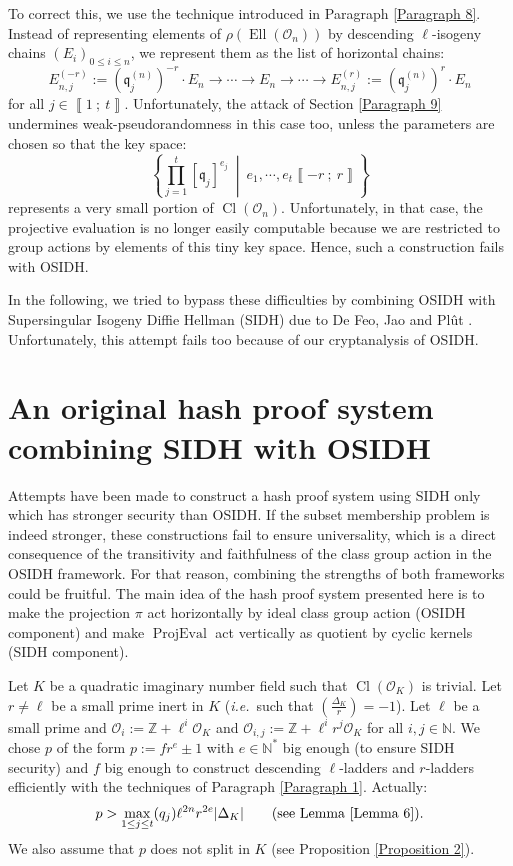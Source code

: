 \documentclass[a4paper,10pt,notitlepage]{report}
\theoremstyle{definition}
\theoremstyle{plain}
\theoremstyle{definition}
\newcommand{\ie}{\emph{i.e.}\ }
\newcommand{\N}{\mathbb{N}}
\newcommand{\Z}{\mathbb{Z}}
\newcommand{\mO}{\mathcal{O}}
\renewcommand{\i}[2]{\left\llbracket #1~;~#2\right\rrbracket}
\renewcommand{\(}{\left(}
\renewcommand{\)}{\right)}
\newcommand{\mf}[1]{\mathfrak{#1}}
\DeclareMathOperator{\Cl}{Cl}
\DeclareMathOperator{\Ell}{Ell}
\DeclareMathOperator{\ProjEval}{ProjEval}
\begin{document}
To correct this, we use the technique introduced in Paragraph \ref{Paragraph 8}. Instead of representing elements of $\rho(\Ell(\mO_n))$ by descending $\ell$-isogeny chains $(E_i)_{0\leq i\leq n}$, we represent them as the list of horizontal chains:
\[E_{n,j}^{(-r)}:=(\mf{q}_j^{(n)})^{-r}\cdot E_n\longrightarrow \cdots \longrightarrow E_{n}\longrightarrow \cdots\longrightarrow E_{n,j}^{(r)}:=(\mf{q}_j^{(n)})^{r}\cdot E_n\]
for all $j\in\i{1}{t}$. Unfortunately, the attack of Section \ref{Paragraph 9} undermines weak-pseudorandomness in this case too, unless the parameters are chosen so that the key space:
\[\left\{\prod_{j=1}^t [\mf{q}_j]^{e_j} \ \middle| \ e_1, \cdots, e_t\i{-r}{r}\right\}\]
represents a very small portion of $\Cl(\mO_n)$. Unfortunately, in that case, the projective evaluation is no longer easily computable because we are restricted to group actions by elements of this tiny key space. Hence, such a construction fails with OSIDH.

In the following, we tried to bypass these difficulties by combining OSIDH with Supersingular Isogeny Diffie Hellman (SIDH) due to De Feo, Jao and Pl\^{u}t \cite{DeFeoSIDH}. Unfortunately, this attempt fails too because of our cryptanalysis of OSIDH.

\section{An original hash proof system combining SIDH with OSIDH}

Attempts have been made to construct a hash proof system using SIDH only which has stronger security than OSIDH. If the subset membership problem is indeed stronger, these constructions fail to ensure universality, which is a direct consequence of the transitivity and faithfulness of the class group action in the OSIDH framework.  For that reason, combining the strengths of both frameworks could be fruitful.  The main idea of the hash proof system presented here is to make the projection $\pi$ act horizontally by ideal class group action (OSIDH component) and make $\ProjEval$ act vertically as quotient by cyclic kernels (SIDH component).   

Let $K$ be a quadratic imaginary number field such that $\Cl(\mO_K)$ is trivial.  Let $r\neq \ell$ be a small prime inert in $K$ (\ie such that $\(\frac{\Delta_K}{r}\)=-1$). Let $\ell$ be a small prime and $\mO_i:=\Z+\ell^i\mO_K$ and $\mO_{i,j}:=\Z+\ell^ir^j\mO_K$ for all $i, j\in\N$. We chose $p$ of the form $p:=f r^e\pm 1$ with $e\in\N^*$ big enough (to ensure SIDH security) and $f$ big enough to construct descending $\ell$-ladders and $r$-ladders efficiently with the techniques of Paragraph \ref{Paragraph 1}. Actually:
\[p>\max_{1\leq j\leq t}(q_j)\ell^{2n}r^{2e}|\Delta_K|\qquad (\mbox{see Lemma \ref{Lemma 6}}).\]
We also assume that $p$ does not split in $K$ (see Proposition \ref{Proposition 2}). 
\end{document}
